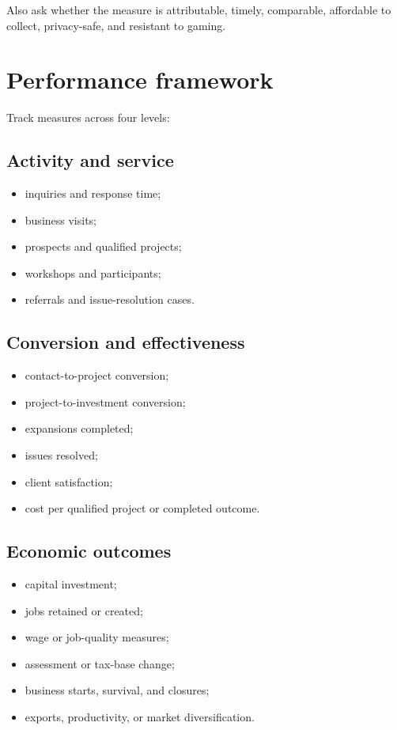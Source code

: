 \documentclass[11pt,letterpaper,oneside,openany]{book}
\begin{document}
Also ask whether the measure is attributable, timely, comparable, affordable to collect, privacy-safe, and resistant to gaming.


\section[Performance framework]{Performance framework}
Track measures across four levels:


\subsection[Activity and service]{Activity and service}
\begin{itemize}
\item inquiries and response time;
\item business visits;
\item prospects and qualified projects;
\item workshops and participants;
\item referrals and issue-resolution cases.
\end{itemize}


\subsection[Conversion and effectiveness]{Conversion and effectiveness}
\begin{itemize}
\item contact-to-project conversion;
\item project-to-investment conversion;
\item expansions completed;
\item issues resolved;
\item client satisfaction;
\item cost per qualified project or completed outcome.
\end{itemize}


\subsection[Economic outcomes]{Economic outcomes}
\begin{itemize}
\item capital investment;
\item jobs retained or created;
\item wage or job-quality measures;
\item assessment or tax-base change;
\item business starts, survival, and closures;
\item exports, productivity, or market diversification.
\end{itemize}
\end{document}

